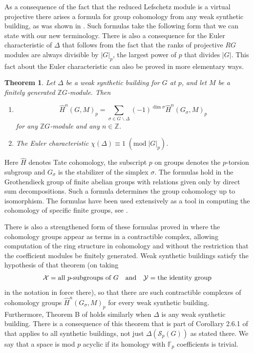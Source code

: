 \documentclass[12pt]{amsart}
\theoremstyle{plain}
\newtheorem{theorem}{Theorem}[section]
\theoremstyle{definition}
\theoremstyle{remark}
\numberwithin{equation}{section}
\def\FF{{\mathbb F}}
\def\ZZ{{\mathbb Z}}
\def\calS{{\mathcal S}}
\def\calX{{\mathcal X}}
\def\calY{{\mathcal Y}}
\newcommand{\bs}{\backslash}
\begin{document}
As a consequence of the fact that the reduced Lefschetz module is a virtual projective there arises a formula for group cohomology from any weak synthetic building, as was shown in \cite[Thm. A]{Web1987-1}. Such formulas take the following form that we can state with our new terminology. There is also a consequence for the Euler characteristic of $\Delta$ that follows from the fact that the ranks of projective $RG$ modules are always divisible by $|G|_p$, the largest power of $p$ that divides $|G|$. This fact about the Euler characteristic can also be proved in more elementary ways.
\begin{theorem}\label{thm:WebbA}
Let $\Delta$ be a weak synthetic building for $G$ at $p$, and let $M$ be a finitely generated $\ZZ G$-module.
Then
\begin{enumerate}
    \item 
$$\hat{H}^n(G,M)_p=\sum_{\sigma\in G\bs\Delta}(-1)^{\dim\sigma}\hat{H}^n(G_\sigma,M)_p$$
for any $\ZZ G$-module and any $n\in\ZZ$.
\item The Euler characteristic $\chi(\Delta)\equiv 1 \;(\textrm{mod}\; |G|_p)$.
\end{enumerate}
\end{theorem}

Here $\hat H$ denotes Tate cohomology, the subscript $p$ on groups denotes the $p$-torsion subgroup and $G_\sigma$ is the stabilizer of the simplex $\sigma$. The formulas hold in the Grothendieck group of finite abelian groups with relations given only by direct sum decompositions. Such a formula determines the group cohomology up to isomorphism. The formulas have been used extensively as a tool in computing the cohomology of specific finite groups, see \cite{Ade2004}. 

There is also a strengthened form of these formulas proved in \cite[Thm. A]{Web1991} where the cohomology groups appear as terms in a contractible complex, allowing computation of the ring structure in cohomology and without the restriction that the coefficient modules be finitely generated. Weak synthetic buildings satisfy the hypothesis of that theorem (on taking
$$
\calX= \hbox{all $p$-subgroups of $G$} \quad\hbox{and}\quad\calY = \hbox{the identity group}
$$
in the notation in force there), so that there are such contractible complexes of cohomology groups $\hat H^n(G_\sigma,M)_p$ for every weak synthetic building. Furthermore, Theorem B of \cite{Web1991} holds similarly when $\Delta$ is any weak synthetic building. There is a consequence of this theorem that is part of Corollary 2.6.1 of \cite{Web1991} that applies to all synthetic buildings, not just  $\Delta(\calS_p(G))$ as stated there. We say that a space is mod $p$ acyclic if its homology with $\FF_p$ coefficients is trivial.
\end{document}
